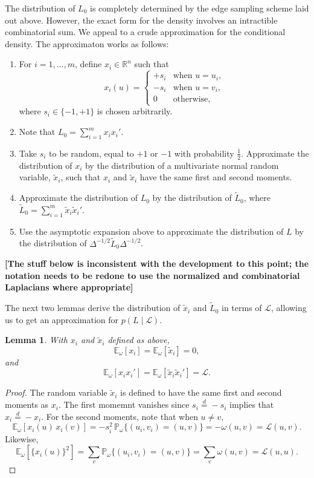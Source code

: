 \documentclass[12pt]{article}
\newcommand{\reals}{\mathbb{R}}
\newcommand{\prob}{\mathbb{P}}
\newcommand{\E}{\mathbb{E}}
\theoremstyle{plain}
\newtheorem{lemma}[theorem]{Lemma}
\begin{document}
The distribution of $L_0$ is completely determined by the edge
sampling scheme laid out above.  However, the exact form for the
density involves an intractible combinatorial sum.  We appeal to a
crude approximation for the conditional density.
The approximaton works as follows:
\begin{enumerate}
\item For $i = 1, \dotsc, m$, define $x_i \in \reals^n$ such that
  \[
    x_i(u)
      =
      \begin{cases}
        +s_i &\text{when $u = u_i$,} \\
        -s_i &\text{when $u = v_i$,} \\
        0 &\text{otherwise,}
      \end{cases}
  \]
  where $s_i \in \{ -1, +1 \}$ is chosen arbitrarily.
\item Note that $L_0 = \sum_{i=1}^m x_i x_i'$.
\item Take $s_i$ to be random, equal to $+1$ or $-1$ with probability
  $\tfrac{1}{2}$.  Approximate the distribution of $x_i$ by the
  distribution of a multivariate normal random variable, $\tilde x_i$,
  such that $x_i$ and $\tilde x_i$ have the same first and second
  moments.
\item Approximate the distribution of $L_0$ by the distribution of $\tilde L_0$, where
  \(
  \tilde L_0 = \sum_{i=1}^m \tilde x_i \tilde x_i'.
  \)
  \item Use the asymptotic expansion above to approximate the
    distribution of $L$ by the distribution of
    $\Delta^{-1/2} \tilde L_0 \Delta^{-1/2}$.
\end{enumerate}

\textbf{[The stuff below is inconsistent with the development to this point;
the notation needs to be redone to use the normalized and
combinatorial Laplacians where appropriate]}

\noindent
The next two lemmas derive the distribution of $\tilde x_i$ and
$\tilde L_0$ in terms of $\mathcal{L}$, allowing us to get an
approximation for $p(L \mid \mathcal{L})$.

\begin{lemma}
  With $x_i$ and $\tilde x_i$ defined as above,
  \[
    \E_\omega[ x_i ] = \E_\omega[ \tilde x_i ] = 0,
  \]
  and
  \[
    \E_\omega[ x_i x_i' ] = \E_\omega [ \tilde x_i \tilde x_i' ] = \mathcal{L}.
  \]
\end{lemma}
\begin{proof}
The random variable $\tilde x_i$ is defined to have the same first
and second moments as $x_i$.
The first momemnt vanishes since $s_i \overset{d}{=} -s_i$ implies
that $x_i \overset{d}{=} -x_i$.  For the second moments, note that
when $u \neq v$, 
\[
  \E_\omega[x_i(u) \, x_i(v)]
  = -s_i^2 \, \prob_\omega\{ (u_i,v_i) = (u,v) \}  = -\omega(u,v)
  = \mathcal{L}(u,v).
\]
Likewise,
\[
  \E_\omega[\{x_i(u)\}^2]
      = \sum_{v} \prob_\omega\{ (u_i,v_i) = (u,v) \}
      = \sum_{v} \omega(u,v)
      = \mathcal{L}(u,u).
\]
\end{proof}
\end{document}
